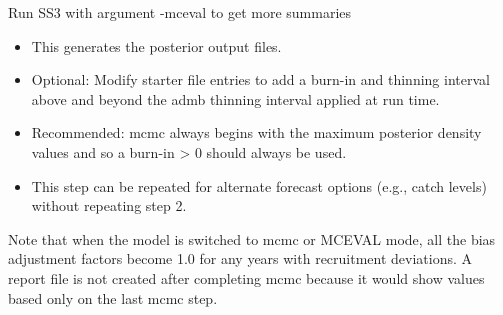 \noindent Run SS3 with argument -mceval to get more summaries
\begin{itemize}
	\item This generates the posterior output files.
	\item Optional: Modify starter file entries to add a burn-in and thinning interval above and beyond the \gls{admb} thinning interval applied at run time.
	\item Recommended: \gls{mcmc} always begins with the maximum posterior density values and so a burn-in > 0 should always be used.
	\item This step can be repeated for alternate forecast options (e.g., catch levels) without repeating step 2.
\end{itemize}

Note that when the model is switched to \gls{mcmc} or MCEVAL mode, all the bias adjustment factors become 1.0 for any years with recruitment deviations. A report file is not created after completing \gls{mcmc} because it would show values based only on the last \gls{mcmc} step.

\pagebreak
